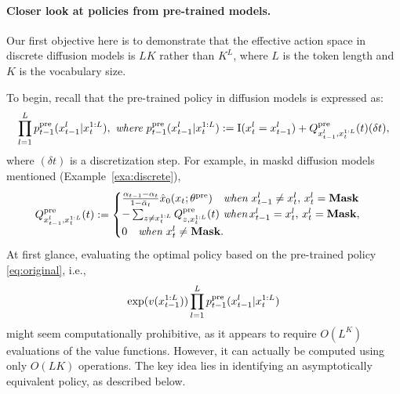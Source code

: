 \paragraph{Closer look at policies from pre-trained models.} Our first objective here is to demonstrate that the effective action space in discrete diffusion models is $LK$ rather than $K^L$, where $L$ is the token length and $K$ is the vocabulary size.

To begin, recall that the pre-trained policy in diffusion models is expressed as:
\begin{align}\label{eq:original}
    \prod_{l=1}^L p^{\mathrm{pre}}_{t-1}(x^{l}_{t-1} | x^{1:L}_{t}),\,\, \textit{where}\,\,  p^{\mathrm{pre}}_{t-1}(x^{l}_{t-1} | x^{1:L}_{t}):=\mathrm{I}(x^l_t=x^l_{t-1}) +     Q^{\mathrm{pre}}_{x^l_{t-1}, x^{1:L}_{t} }(t)   (\delta t),
\end{align}
where $(\delta t)$ is a discretization step. For example, in maskd diffusion models mentioned (Example~\ref{exa:discrete}), 
\begin{align*}
     Q^{\mathrm{pre}}_{x^l_{t-1}, x^{1:L}_{t} }(t):=  
     \begin{cases}
            \frac{\alpha_{t-1} - \alpha_t  }{1-\bar \alpha_t}\hat x_0(x_t;\theta^{\mathrm{pre}})\quad \textit{when}\,\,x^l_{t-1}\neq x^l_t, \, x^l_t=\textbf{Mask} \\
            -\sum_{z \neq x^{1:L}_{t} }Q^{\mathrm{pre}}_{z, x^{1:L}_{t} }(t) \,\,\textit{when}\,x^l_{t-1}= x^l_t,\,x^l_t=\textbf{Mask}, \\
            0\quad \textit{when}\,\,x^l_t\neq \textbf{Mask}. 
     \end{cases}
\end{align*}
{ At first glance, evaluating the optimal policy based on the pre-trained policy \eqref{eq:original}, i.e., 
\begin{align*}
    \exp(v(x^{1:L}_{t-1}))\prod_{l=1}^L p^{\mathrm{pre}}_{t-1}(x^{l}_{t-1} | x^{1:L}_{t})
\end{align*}
might seem computationally prohibitive}, as it appears to require $O(L^K)$ evaluations of the value functions. However, it can actually be computed using only $O(LK)$ operations. The key idea lies in identifying an asymptotically equivalent policy, as described below.
